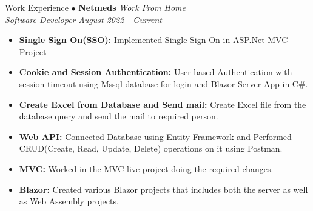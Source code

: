 \begin{rSection}{Work Experience}
    $\bullet$ \textbf{Netmeds} \hfill {\em Work From Home}\\
    {\em Software Developer} \hfill{\em August 2022 - Current}\\
    \begin{itemize}
        \item \textbf{Single Sign On(SSO):} Implemented Single Sign On in ASP.Net MVC Project
        \item \textbf{Cookie and Session Authentication:} User based Authentication with session timeout using Mssql database for login and Blazor Server App in C\#.
        \item \textbf{Create Excel from Database and Send mail:} Create Excel file from the database query and send the mail to required person.
        \item \textbf{Web API:} Connected Database using Entity Framework and Performed CRUD(Create, Read, Update, Delete) operations on it using Postman.
        \item \textbf{MVC:} Worked in the MVC live project doing the required changes.
        \item \textbf{Blazor:} Created various Blazor projects that includes both the server as well as Web Assembly projects.
    \end{itemize}
\end{rSection}